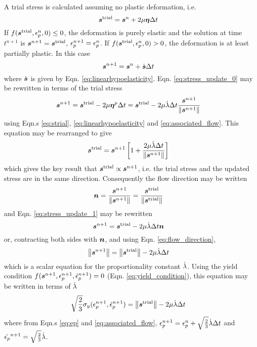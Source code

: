 A trial stress is calculated assuming no plastic deformation, i.e.
  \begin{equation}\label{eq:strial}
    {\Bs^{\text{trial}}} = \Bs^n + 2\mu\Beta\Delta t
  \end{equation}
If $f(\Bs^{\text{trial}},\Ep^n,0)\le0$, the deformation is purely
elastic and the solution at time $t^{n+1}$ is
$\Bs^{n+1}=\Bs^{\text{trial}}$, $\Ep^{n+1}=\Ep^n$.  If
$f(\Bs^{\text{trial}},\Ep^n,0)>0$, the deformation is at least
partially plastic.  In this case
  \begin{equation}\label{eq:stress_update_0}
    \Bs^{n+1} = \Bs^n + \dot{\Bs}\Delta t
  \end{equation}
where $\dot{\Bs}$ is given by Eqn. \ref{eq:linearhypoelasticity}.
Eqn. \ref{eq:stress_update_0} may be rewritten in terms of the trial
stress
  \begin{equation}\label{eq:stress_update_1}
    \Bs^{n+1} = \Bs^{\text{trial}} - 2\mu\Beta^p\Delta t = \Bs^{\text{trial}} - 2\mu\lambdadot\Delta t {\Bs^{n+1}\over\norm{\Bs^{n+1}}}
  \end{equation}
using Eqn.s \ref{eq:strial}, \ref{eq:linearhypoelasticity} and
\ref{eq:associated_flow}.  This equation may be rearranged to give
  \begin{equation}
    \Bs^{\text{trial}} = \Bs^{n+1} \left[ 1 + {2\mu\lambdadot\Delta t\over\norm{\Bs^{n+1}}}\right]
  \end{equation}
which gives the key result that $\Bs^{\text{trial}} \propto
\Bs^{n+1}$, i.e. the trial stress and the updated stress are in the
same direction.  Consequently the flow direction may be written
  \begin{equation}\label{eq:flow_direction}
    \Bn={\Bs^{n+1}\over\norm{\Bs^{n+1}}}={\Bs^{\text{trial}}\over\norm{\Bs^{\text{trial}}}}
  \end{equation}
and Eqn. \ref{eq:stress_update_1} may be rewritten
  \begin{equation}\label{eq:stress_update_2}
    \Bs^{n+1} = \Bs^{\text{trial}} - 2\mu\lambdadot\Delta t \Bn
  \end{equation}
or, contracting both sides with $\Bn$, and using Eqn. \ref{eq:flow_direction},
  \begin{equation}
    \norm{\Bs^{n+1}} = \norm{\Bs^{\text{trial}}} - 2\mu\lambdadot\Delta t
  \end{equation}
which is a scalar equation for the proportionality constant
$\lambdadot$.  Using the yield condition
$f(\Bs^{n+1},\Ep^{n+1},\Epdot{}^{n+1})=0$
(Eqn. \ref{eq:yield_condition}), this equation may be written in terms
of $\lambdadot$
  \begin{equation}\label{eq:stress_update_3}
     \sqrt{2\over3}\sigma_y(\Ep^{n+1},\Epdot{}^{n+1}) = \norm{\Bs^{\text{trial}}} - 2\mu\lambdadot\Delta t
  \end{equation}
where from Eqn.s \ref{eq:ep} and \ref{eq:associated_flow},
$\Ep^{n+1}=\Ep^n+\sqrt{2\over3}\lambdadot\Delta t$ and $\dot{\Ep}^{n+1}=\sqrt{2\over3}\lambdadot$.

